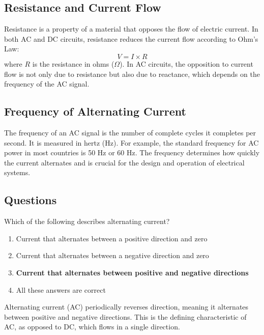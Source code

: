 \subsection*{Resistance and Current Flow}
Resistance is a property of a material that opposes the flow of electric current. In both AC and DC circuits, resistance reduces the current flow according to Ohm's Law:
\begin{equation}
    V = I \times R
\end{equation}
where \( R \) is the resistance in ohms (\(\Omega\)). In AC circuits, the opposition to current flow is not only due to resistance but also due to reactance, which depends on the frequency of the AC signal.

\subsection*{Frequency of Alternating Current}
The frequency of an AC signal is the number of complete cycles it completes per second. It is measured in hertz (Hz). For example, the standard frequency for AC power in most countries is 50 Hz or 60 Hz. The frequency determines how quickly the current alternates and is crucial for the design and operation of electrical systems.

\subsection*{Questions}
\begin{tcolorbox}[colback=gray!10!white,colframe=black!75!black,title={T5A09}]
    Which of the following describes alternating current?
    \begin{enumerate}[label=\Alph*,noitemsep]
        \item Current that alternates between a positive direction and zero
        \item Current that alternates between a negative direction and zero
        \item \textbf{Current that alternates between positive and negative directions}
        \item All these answers are correct
    \end{enumerate}
\end{tcolorbox}
Alternating current (AC) periodically reverses direction, meaning it alternates between positive and negative directions. This is the defining characteristic of AC, as opposed to DC, which flows in a single direction.


